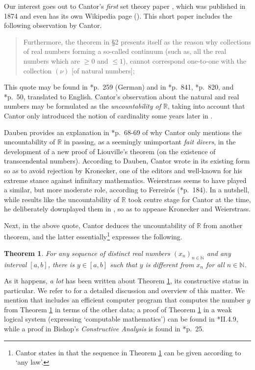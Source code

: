 \documentclass[reqno]{amsart}
\newtheorem{thm}{Theorem}
\def\N{{\mathbb  N}}
\def\R{{\mathbb  R}}
\numberwithin{equation}{section}
\numberwithin{thm}{section}
\begin{document}
Our interest goes out to Cantor's \emph{first} set theory paper \cite{cantor1}, which was published in 1874 and even has its own Wikipedia page (\cite{wica}).
This short paper includes the following observation by Cantor.
\begin{quote}
Furthermore, the theorem in \S2 presents itself as the reason why collections of real numbers forming a so-called continuum (such as, all the real numbers which are $\geq 0$ and $\leq 1$), cannot correspond one-to-one with the collection $(\nu)$ [of natural numbers]; 
\end{quote}
This quote may be found in \cite{cantor1}*{p.\ 259} (German) and in \cite{ewa}*{p.\ 841}, \cite{grayk}*{p.\ 820}, and \cite{dauben1}*{p.\ 50}, translated to English.
Cantor's observation about the natural and real numbers may be formulated as the \emph{uncountability of $\R$}, taking into account that Cantor only introduced the notion of cardinality some years later in \cite{cantor2}.

\smallskip

Dauben provides an explanation in \cite{dauben1}*{p.\ 68-69} of why Cantor only mentions the uncountability of $\R$ in passing, as a seemingly unimportant \emph{fait divers}, in the development 
of a new proof of Liouville's theorem (on the existence of transcendental numbers).  According to Dauben, Cantor wrote \cite{cantor1} in its existing form so as to avoid rejection by Kronecker, 
one of the editors and well-known for his extreme stance against infinitary mathematics.  Weierstrass seems to have played a similar, but more moderate role, according to Ferreir\'os (\cite{nofega}*{p.\ 184}).       
In a nutshell, while results like the uncountability of $\R$ took centre stage for Cantor at the time, he deliberately downplayed them in \cite{cantor1}, so as to appease Kronecker and Weierstrass.  

\smallskip

Next, in the above quote, Cantor deduces the uncountability of $\R$ from another theorem, 
and the latter essentially\footnote{Cantor states in \cite{cantor1} that the sequence in Theorem \ref{cant2} can be given according to `any law'.} expresses the following.  
\begin{thm}\label{cant2}
For any sequence of distinct real numbers $(x_{n})_{n\in \N}$ and any interval $[a,b]$, there is $y\in [a,b]$ such that $y$ is different from $x_{n}$ for all $n\in \N$.
\end{thm}
As it happens, \emph{a lot} has been written about Theorem \ref{cant2}, its constructive status in particular.  We refer to \cite{grayk} for a detailed discussion and overview of this matter.  
We mention that \cite{grayk} includes an efficient computer program that computes the number $y$ from Theorem \ref{cant2} in terms of the other data; a proof of Theorem \ref{cant2} in a weak logical system (expressing `computable mathematics') can be found in \cite{simpson2}*{II.4.9}, while a proof in Bishop's \emph{Constructive Analysis} is found in \cite{bish1}*{p.\ 25}.  
\end{document}
